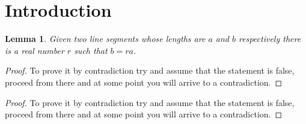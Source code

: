 \documentclass{article}
\newtheorem{lemma}[theorem]{Lemma}
\begin{document}
	\section{Introduction}
	
	\begin{lemma}
		Given two line segments whose lengths are \(a\) and \(b\) respectively there 
		is a real number \(r\) such that \(b=ra\).
	\end{lemma}
	
	\renewcommand\qedsymbol{$\blacksquare$}
	
	\begin{proof}
		To prove it by contradiction try and assume that the statement is false,
		proceed from there and at some point you will arrive to a contradiction.
	\end{proof}
	
	\renewcommand\qedsymbol{QED}
	
	\begin{proof}
		To prove it by contradiction try and assume that the statement is false,
		proceed from there and at some point you will arrive to a contradiction.
	\end{proof}
\end{document}
